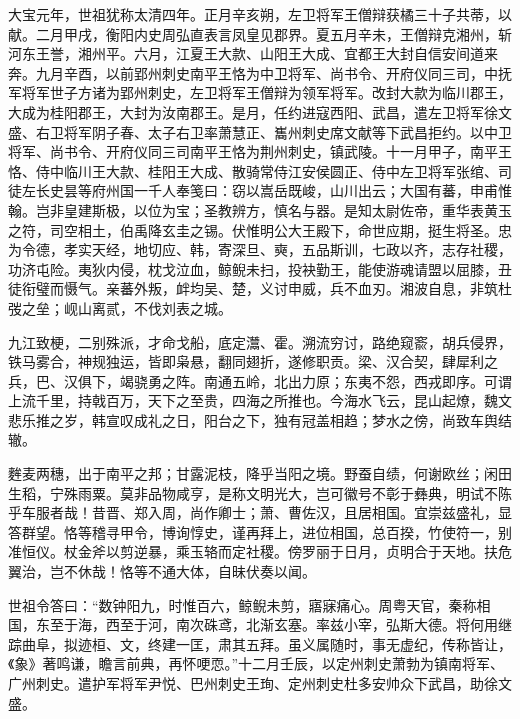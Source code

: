 \documentclass[12pt,UTF8]{ctexbook}
\begin{document}
大宝元年，世祖犹称太清四年。正月辛亥朔，左卫将军王僧辩获橘三十子共蒂，以献。二月甲戌，衡阳内史周弘直表言凤皇见郡界。夏五月辛未，王僧辩克湘州，斩河东王誉，湘州平。六月，江夏王大款、山阳王大成、宜都王大封自信安间道来奔。九月辛酉，以前郢州刺史南平王恪为中卫将军、尚书令、开府仪同三司，中抚军将军世子方诸为郢州刺史，左卫将军王僧辩为领军将军。改封大款为临川郡王，大成为桂阳郡王，大封为汝南郡王。是月，任约进寇西阳、武昌，遣左卫将军徐文盛、右卫将军阴子春、太子右卫率萧慧正、巂州刺史席文献等下武昌拒约。以中卫将军、尚书令、开府仪同三司南平王恪为荆州刺史，镇武陵。十一月甲子，南平王恪、侍中临川王大款、桂阳王大成、散骑常侍江安侯圆正、侍中左卫将军张绾、司徒左长史昙等府州国一千人奉笺曰：窃以嵩岳既峻，山川出云；大国有蕃，申甫惟翰。岂非皇建斯极，以位为宝；圣教辨方，慎名与器。是知太尉佐帝，重华表黄玉之符，司空相土，伯禹降玄圭之锡。伏惟明公大王殿下，命世应期，挺生将圣。忠为令德，孝实天经，地切应、韩，寄深旦、奭，五品斯训，七政以齐，志存社稷，功济屯险。夷狄内侵，枕戈泣血，鲸鲵未扫，投袂勤王，能使游魂请盟以屈膝，丑徒衔璧而慑气。亲蕃外叛，衅均吴、楚，义讨申威，兵不血刃。湘波自息，非筑杜弢之垒；岘山离贰，不伐刘表之城。

九江致梗，二别殊派，才命戈船，底定灊、霍。溯流穷讨，路绝窥窬，胡兵侵界，铁马雾合，神规独运，皆即枭悬，翻同翅折，遂修职贡。梁、汉合契，肆犀利之兵，巴、汉俱下，竭骁勇之阵。南通五岭，北出力原；东夷不怨，西戎即序。可谓上流千里，持戟百万，天下之至贵，四海之所推也。今海水飞云，昆山起燎，魏文悲乐推之岁，韩宣叹成礼之日，阳台之下，独有冠盖相趋；梦水之傍，尚致车舆结辙。

麰麦两穗，出于南平之邦；甘露泥枝，降乎当阳之境。野蚕自绩，何谢欧丝；闲田生稻，宁殊雨粟。莫非品物咸亨，是称文明光大，岂可徽号不彰于彝典，明试不陈乎车服者哉！昔晋、郑入周，尚作卿士；萧、曹佐汉，且居相国。宜崇兹盛礼，显答群望。恪等稽寻甲令，博询惇史，谨再拜上，进位相国，总百揆，竹使符一，别准恒仪。杖金斧以剪逆暴，乘玉辂而定社稷。傍罗丽于日月，贞明合于天地。扶危翼治，岂不休哉！恪等不通大体，自昧伏奏以闻。

世祖令答曰：“数钟阳九，时惟百六，鲸鲵未剪，寤寐痛心。周粤天官，秦称相国，东至于海，西至于河，南次硃鸢，北渐玄塞。率兹小宰，弘斯大德。将何用继踪曲阜，拟迹桓、文，终建一匡，肃其五拜。虽义属随时，事无虚纪，传称皆让，《象》著鸣谦，瞻言前典，再怀哽恧。”十二月壬辰，以定州刺史萧勃为镇南将军、广州刺史。遣护军将军尹悦、巴州刺史王珣、定州刺史杜多安帅众下武昌，助徐文盛。
\end{document}
